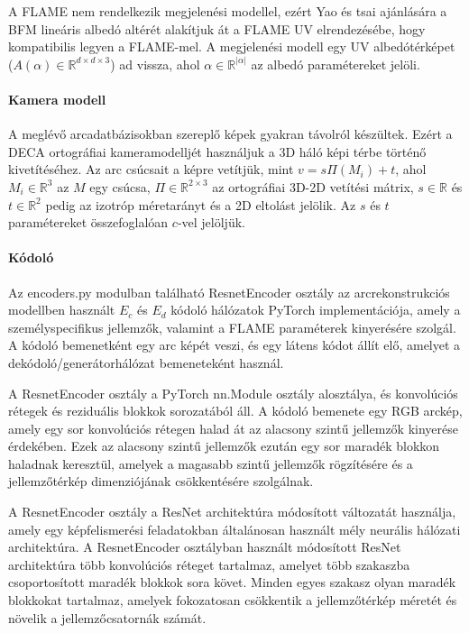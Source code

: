 \documentclass[12pt,a4]{article}
\begin{document}
        A FLAME nem rendelkezik megjelenési modellel, ezért \cite{deca} Yao és tsai ajánlására a BFM lineáris albedó altérét alakítjuk át
        a FLAME UV elrendezésébe, hogy kompatibilis legyen a FLAME-mel. A megjelenési modell egy UV albedótérképet ($A(\alpha) \in \mathbb{R}^{d \times d \times 3}$) ad vissza, ahol $\alpha \in \mathbb{R}^{|\alpha|}$ az albedó paramétereket jelöli.  
         
         \paragraph{Kamera modell}

          A meglévő arcadatbázisokban szereplő képek gyakran távolról készültek.
          Ezért a DECA ortográfiai kameramodelljét használjuk a 3D háló képi térbe történő kivetítéséhez.
          Az arc csúcsait a képre vetítjük, mint $v = s\Pi(M_{i}) + t$, ahol
          $M_{i} \in \mathbb{R}^{3}$ az $M$ egy csúcsa, $\Pi \in \mathbb{R}^{2 \times 3}$ az ortográfiai 3D-2D vetítési mátrix, $s \in \mathbb{R}$ és $t \in \mathbb{R}^{2}$ pedig az izotróp méretarányt és a 2D eltolást jelölik. Az $s$ és $t$ paramétereket összefoglalóan $c$-vel jelöljük.
                     
         \paragraph{Kódoló}

            Az encoders.py modulban található ResnetEncoder osztály az arcrekonstrukciós modellben használt $E_c$ és $E_d$ kódoló  hálózatok PyTorch implementációja, amely a személyspecifikus jellemzők, valamint a FLAME paraméterek kinyerésére szolgál. 
            A kódoló bemenetként egy arc képét veszi, és egy látens kódot állít elő, amelyet a dekódoló/generátorhálózat bemeneteként használ.
            
            A ResnetEncoder osztály a PyTorch nn.Module osztály alosztálya, és konvolúciós rétegek és reziduális blokkok sorozatából áll.
            A kódoló bemenete egy RGB arckép, amely egy sor konvolúciós rétegen halad át az alacsony szintű jellemzők kinyerése érdekében.
            Ezek az alacsony szintű jellemzők ezután egy sor maradék blokkon haladnak keresztül, amelyek a magasabb szintű jellemzők rögzítésére és a jellemzőtérkép dimenziójának csökkentésére szolgálnak.
            
            A ResnetEncoder osztály a ResNet architektúra módosított változatát használja, amely egy képfelismerési feladatokban általánosan használt mély neurális hálózati architektúra.
            A ResnetEncoder osztályban használt módosított ResNet architektúra több konvolúciós réteget tartalmaz, amelyet több szakaszba csoportosított maradék blokkok sora követ.
            Minden egyes szakasz olyan maradék blokkokat tartalmaz, amelyek fokozatosan csökkentik a jellemzőtérkép méretét és növelik a jellemzőcsatornák számát.
            
\end{document}
